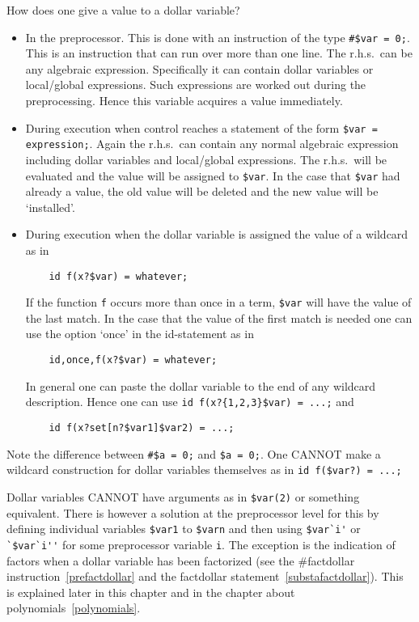 How does one give a value to a dollar variable?
\begin{itemize}
\item In the preprocessor. This is done with an instruction of the type 
\verb:#$var = 0;:. This is an instruction that can run over more than one 
line. The r.h.s.\ can be any algebraic expression. Specifically it can 
contain dollar variables or local/global expressions. Such 
expressions are worked out during the preprocessing. Hence this variable 
acquires a value immediately.
\item During execution when control reaches a statement of the form 
\verb:$var = expression;:. Again the r.h.s.\ can contain any normal 
algebraic expression including dollar variables and local/global 
expressions. The r.h.s.\ will be evaluated and the value will be assigned to 
\verb:$var:. In the case that \verb:$var: had already a value, the old 
value will be deleted and the new value will be `installed'.
\item During execution when the dollar variable is assigned the value of a 
wildcard as in
\begin{verbatim}
    id f(x?$var) = whatever;
\end{verbatim}
If the function \verb:f: 
occurs more than once in a term, \verb:$var: will have the value of the 
last match. In the case that the value of the first match is needed one can 
use the option `once' in the id-statement as in
\begin{verbatim}
    id,once,f(x?$var) = whatever;
\end{verbatim}
In general one can paste the dollar variable to the end of any 
wildcard description. Hence one can use \verb:id f(x?{1,2,3}$var) = ...;: 
and
\begin{verbatim}
    id f(x?set[n?$var1]$var2) = ...;
\end{verbatim}
\end{itemize}
Note the difference between \verb:#$a = 0;: and \verb:$a = 0;:. One CANNOT 
make a wildcard construction for dollar variables 
themselves as in \verb:id f($var?) = ...;:

Dollar variables CANNOT have arguments as in \verb:$var(2): or something 
equivalent. There is however a solution at the preprocessor level for this 
by defining individual variables \verb:$var1: to \verb:$varn: and then 
using \verb:$var`i': or \verb:`$var`i'': for some preprocessor variable 
\verb:i:. The exception is the indication of factors when a dollar variable 
has been factorized (see the \#factdollar instruction~\ref{prefactdollar} 
and the factdollar statement~\ref{substafactdollar}). This is explained 
later in this chapter and in the chapter about 
polynomials~\ref{polynomials}.

